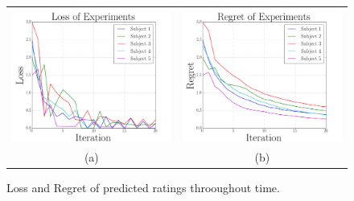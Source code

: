 \documentclass[twoside,11pt]{article}
\begin{document}
\begin{figure}
\centering
\begin{tabular}{cc}
\includegraphics[scale=0.25]{Loss.png}  & \includegraphics[scale=0.25]{Regret.png}\\
(a) & (b)
\end{tabular}
\caption{Loss and Regret of predicted ratings throoughout time.}\label{fig:regret}
\end{figure}
\end{document}
